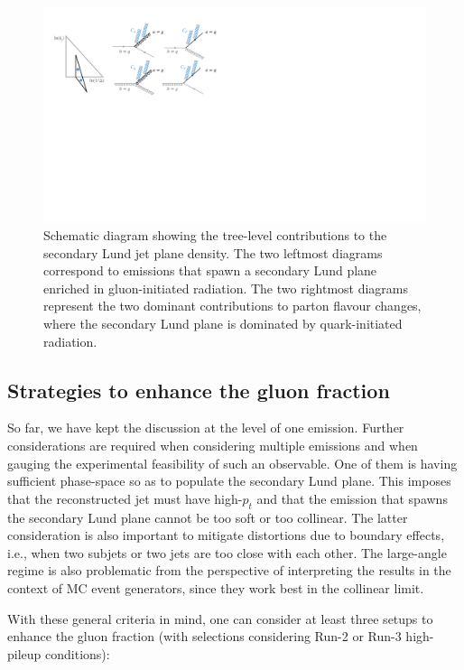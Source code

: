 \documentclass[a4paper,11pt]{article}
\begin{document}
\begin{figure}
    \centering
    \includegraphics[width = 1\textwidth]{figures/secondary_sketch.pdf}
    \caption{Schematic diagram showing the tree-level contributions to the secondary Lund jet plane density. The two leftmost diagrams correspond to emissions that spawn a secondary Lund plane enriched in gluon-initiated radiation. The two rightmost diagrams represent the two dominant contributions to parton flavour changes, where the secondary Lund plane is dominated by quark-initiated radiation.}
    \label{fig:gluonVsQuarkParisi}
\end{figure}

\subsection{Strategies to enhance the gluon fraction}
\label{sec:enhance-gfrac}

So far, we have kept the discussion at the level of one emission. Further considerations are required when considering multiple emissions and when gauging the experimental feasibility of such an observable. One of them is having sufficient phase-space so as to populate the secondary Lund plane. This imposes that the reconstructed jet must have  high-$p_t$ and that the emission that spawns the secondary Lund plane cannot be too soft or too collinear. The latter consideration is also important to mitigate distortions due to boundary effects, i.e., when two subjets or two jets are too close with each other. The large-angle regime is also problematic from the perspective of interpreting the results in the context of MC event generators, since they work best in the collinear limit. 

With these general criteria in mind, one can consider at least three setups to enhance the gluon fraction (with selections considering Run-2 or Run-3 high-pileup conditions):
\end{document}
